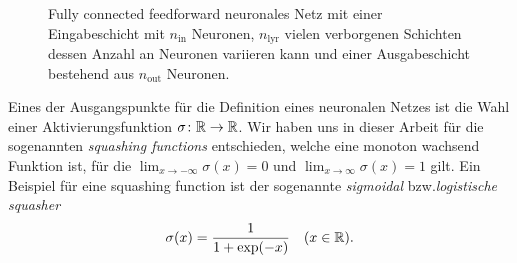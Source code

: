 \begin{center}
\begin{figure}
        \caption{Fully connected feedforward neuronales Netz mit einer Eingabeschicht mit $n_{\mathrm{in}}$ Neuronen, $n_{\mathrm{lyr}}$ vielen verborgenen Schichten dessen Anzahl an Neuronen variieren kann und einer Ausgabeschicht bestehend aus $n_{\mathrm{out}}$ Neuronen.}
        \label{fig:DNN}
    \end{figure}
\end{center}
Eines der Ausgangspunkte für die Definition eines neuronalen Netzes ist die Wahl einer Aktivierungsfunktion $\sigma\colon \mathbb{R} \to \mathbb{R}$. Wir haben uns in dieser Arbeit für die sogenannten \textit{squashing functions} entschieden, welche eine monoton wachsend Funktion ist, für die $\lim_{x \to -\infty}\sigma(x) = 0$ und $\lim_{x \to \infty}\sigma(x) = 1$ gilt. Ein Beispiel für eine squashing function ist der sogenannte \emph{sigmoidal} bzw.\@ \emph{logistische squasher}
\begin{align}
\label{logsquasher}
\sigma(x) = \frac{1}{1 + \exp(-x)} \quad (x \in \mathbb{R}).
\end{align}

